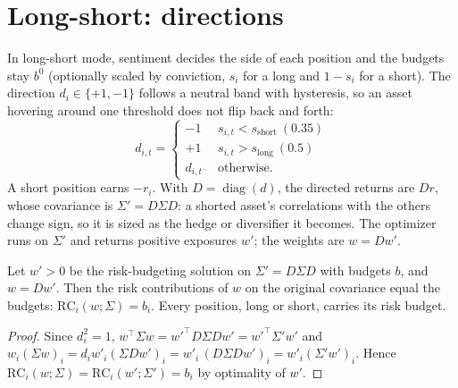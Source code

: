 \section{Long-short: directions}\label{sec:rb-longshort}
In long-short mode, sentiment decides the side of each position and the budgets stay $b^0$ (optionally scaled by
conviction, $s_i$ for a long and $1-s_i$ for a short). The direction $d_i\in\{+1,-1\}$ follows a neutral band with
hysteresis, so an asset hovering around one threshold does not flip back and forth:
\[
  d_{i,t}=\begin{cases}-1&s_{i,t}<s_{\mathrm{short}}\ (0.35)\\ +1&s_{i,t}>s_{\mathrm{long}}\ (0.5)\\ d_{i,t^-}&\text{otherwise.}\end{cases}
\]
A short position earns $-r_i$. With $D=\operatorname{diag}(d)$, the directed returns are $Dr$, whose covariance is
$\Sigma'=D\Sigma D$: a shorted asset's correlations with the others change sign, so it is sized as the hedge or
diversifier it becomes. The optimizer runs on $\Sigma'$ and returns positive exposures $w'$; the weights are
$w=Dw'$.
\begin{proposition}\label{prop:rb-short}
Let $w'>0$ be the risk-budgeting solution on $\Sigma'=D\Sigma D$ with budgets $b$, and $w=Dw'$. Then the risk
contributions of $w$ on the original covariance equal the budgets: $\mathrm{RC}_i(w;\Sigma)=b_i$. Every position,
long or short, carries its risk budget.
\end{proposition}
\begin{proof}
Since $d_i^2=1$, $w^\top\Sigma w=w'^\top D\Sigma Dw'=w'^\top\Sigma'w'$ and
$w_i(\Sigma w)_i=d_iw'_i(\Sigma Dw')_i=w'_i\,(D\Sigma Dw')_i=w'_i(\Sigma'w')_i$. Hence
$\mathrm{RC}_i(w;\Sigma)=\mathrm{RC}_i(w';\Sigma')=b_i$ by optimality of $w'$.
\end{proof}

